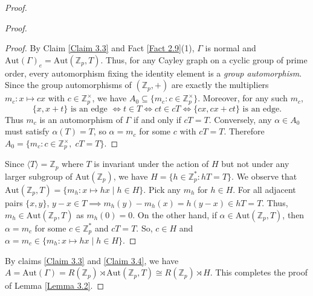 \documentclass[12pt,reqno,a4paper]{amsart}
\theoremstyle{definition}
\begin{document}
\begin{proof}
\begin{proof}
\begin{proof}
By Claim \ref{Claim 3.3} and Fact \ref{Fact 2.9}(1), $\Gamma$ is normal and $\mathrm{Aut}(\Gamma)_e=\mathrm{Aut}(\mathbb{Z}_{p},T)$. Thus, for any Cayley graph on a cyclic group of prime order, every automorphism fixing the identity element is a \emph{group automorphism}.
Since the group automorphisms of $(\mathbb{Z}_p,+)$ are exactly the multipliers $m_c : x \mapsto cx$ with $c \in \mathbb{Z}_p^{\times}$, we have
$A_0 \subseteq \{m_c : c \in \mathbb{Z}_p^{\times}\}$.
Moreover, for any such $m_c$,
\[
\{x, x+t\} \text{ is an edge } \iff t \in T
   \iff c t \in cT
   \iff \{cx, cx + c t\} \text{ is an edge}.
\]
Thus $m_c$ is an automorphism of $\Gamma$ if and only if $cT = T$.  
Conversely, any $\alpha \in A_0$ must satisfy $\alpha(T) = T$, so $\alpha = m_c$ for some $c$ with $cT = T$.  
Therefore $A_0 = \{m_c : c \in \mathbb{Z}_p^{\times},\; cT = T\}$.
 \end{proof}

Since $\langle T\rangle=\mathbb{Z}_{p}$ where $T$ is invariant under the action of $H$ but not under any larger subgroup of $\mathrm{Aut}(\mathbb{Z}_{p})$, we have $H=\{h\in\mathbb{Z}_p^{*} : hT=T\}$.
We observe that
$\mathrm{Aut}(\mathbb{Z}_p,T)
     = \{m_h : x \mapsto h x \mid h \in H\}$.
Pick any $m_{h}$ for $h\in H$.
For all adjacent pairs $\{x,y\}$, $y-x\in T\implies m_{h}(y)-m_{h}(x)=h(y-x)\in hT=T$. Thus, $m_{h}\in \mathrm{Aut}(\mathbb{Z}_{p},T)$ as $m_{h}(0)=0$. On the other hand, if $\alpha\in \mathrm{Aut}(\mathbb{Z}_p,T)$, then $\alpha=m_{c}$ for some $c\in \mathbb{Z}_{p}^{*}$ and $cT=T$. So, $c\in H$ and $\alpha=m_{c}\in \{m_h : x \mapsto h x \mid h \in H\}$.
 \end{proof}

By claims \ref{Claim 3.3} and \ref{Claim 3.4}, we have $A=\mathrm{Aut}(\Gamma) = R(\mathbb{Z}_{p})\rtimes \mathrm{Aut}(\mathbb{Z}_{p},T)\cong R(\mathbb{Z}_{p}) \rtimes H$. This completes the proof of Lemma \ref{Lemma 3.2}.
 \end{proof}
\end{document}
